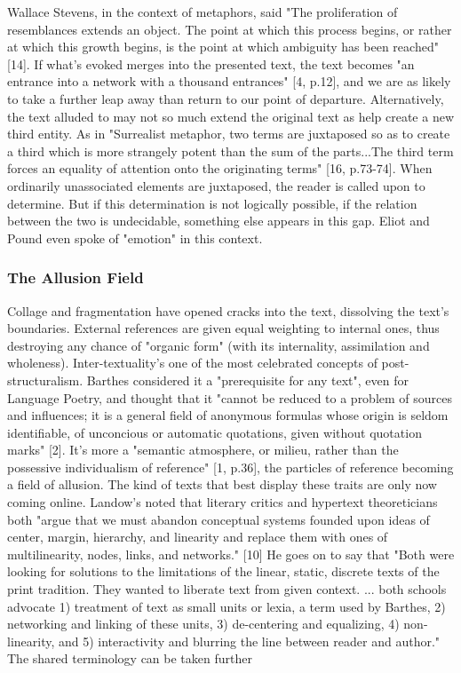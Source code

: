 \documentclass[11pt]{article}
\begin{document}
Wallace Stevens, in the context of metaphors, said "The proliferation of resemblances extends an object. The point at which this process begins, or rather at which this growth begins, is the point at which ambiguity has been reached" [14]. If what's evoked merges into the presented text, the text becomes "an entrance into a network with a thousand entrances" [4, p.12], and we are as likely to take a further leap away than return to our point of departure. Alternatively, the text alluded to may not so much extend the original text as help create a new third entity. As in "Surrealist metaphor, two terms are juxtaposed so as to create a third which is more strangely potent than the sum of the parts...The third term forces an equality of attention onto the originating terms" [16, p.73-74]. When ordinarily unassociated elements are juxtaposed, the reader is called upon to determine. But if this determination is not logically possible, if the relation between the two is undecidable, something else appears in this gap. Eliot and Pound even spoke of "emotion" in this context.

\subsubsection*{The Allusion Field}

Collage and fragmentation have opened cracks into the text, dissolving the text's boundaries. External references are given equal weighting to internal ones, thus destroying any chance of "organic form" (with its internality, assimilation and wholeness). Inter-textuality's one of the most celebrated concepts of post-structuralism. Barthes considered it a "prerequisite for any text", even for Language Poetry, and thought that it "cannot be reduced to a problem of sources and influences; it is a general field of anonymous formulas whose origin is seldom identifiable, of unconcious or automatic quotations, given without quotation marks" [2]. It's more a "semantic atmosphere, or milieu, rather than the possessive individualism of reference" [1, p.36], the particles of reference becoming a field of allusion. The kind of texts that best display these traits are only now coming online. Landow's noted that literary critics and hypertext theoreticians both "argue that we must abandon conceptual systems founded upon ideas of center, margin, hierarchy, and linearity and replace them with ones of multilinearity, nodes, links, and networks." [10] He goes on to say that "Both were looking for solutions to the limitations of the linear, static, discrete texts of the print tradition. They wanted to liberate text from given context. ... both schools advocate 1) treatment of text as small units or lexia, a term used by Barthes, 2) networking and linking of these units, 3) de-centering and equalizing, 4) non-linearity, and 5) interactivity and blurring the line between reader and author." The shared terminology can be taken further
\end{document}
